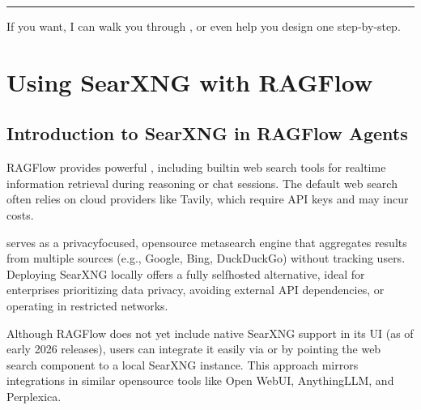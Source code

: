 \documentclass[letterpaper,10pt,english]{sphinxmanual}
\begin{document}
\bigskip\hrule\bigskip


\sphinxAtStartPar
If you want, I can walk you through , or even help you design one step‑by‑step.

\sphinxstepscope


\chapter{Using SearXNG with RAGFlow}
\label{\detokenize{searxng:using-searxng-with-ragflow}}\label{\detokenize{searxng::doc}}

\section{Introduction to SearXNG in RAGFlow Agents}
\label{\detokenize{searxng:introduction-to-searxng-in-ragflow-agents}}
\sphinxAtStartPar
RAGFlow provides powerful , including built\sphinxhyphen{}in web
search tools for real\sphinxhyphen{}time information retrieval during reasoning or
chat sessions. The default web search often relies on cloud providers
like Tavily, which require API keys and may incur costs.

\sphinxAtStartPar
{} serves as a privacy\sphinxhyphen{}focused, open\sphinxhyphen{}source metasearch engine
that aggregates results from multiple sources (e.g., Google, Bing,
DuckDuckGo) without tracking users. Deploying SearXNG locally offers a
fully self\sphinxhyphen{}hosted alternative, ideal for enterprises prioritizing data
privacy, avoiding external API dependencies, or operating in restricted
networks.

\sphinxAtStartPar
Although RAGFlow does not yet include native SearXNG support in its UI
(as of early 2026 releases), users can integrate it easily via  or by pointing the web search component to a local SearXNG
instance. This approach mirrors integrations in similar open\sphinxhyphen{}source
tools like Open WebUI, AnythingLLM, and Perplexica.
\end{document}
